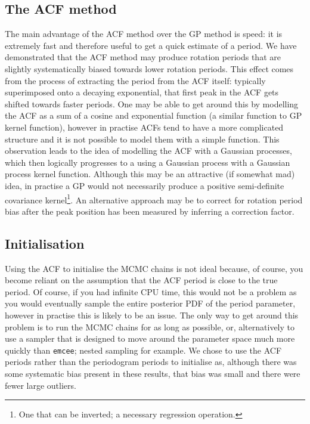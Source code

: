 \subsection{The ACF method}
The main advantage of the ACF method over the GP method is speed: it is
extremely fast and therefore useful to get a quick estimate of a period.
We have demonstrated that the ACF method may produce rotation periods that are
slightly systematically biased towards lower rotation periods.
This effect comes from the process of extracting the period from the ACF
itself: typically superimposed onto a decaying exponential, that first peak in
the ACF gets shifted towards faster periods.
One may be able to get around this by modelling the ACF as a sum of a cosine
and exponential function (a similar function to GP kernel function), however
in practise ACFs tend to have a more complicated structure and it is not
possible to model them with a simple function.
This observation leads to the idea of modelling the ACF with a Gaussian
processes, which then logically progresses to a using a Gaussian process with
a Gaussian process kernel function.
Although this may be an attractive (if somewhat mad) idea, in practise a GP
would not necessarily produce a positive semi-definite covariance
kernel\footnote{One that can be inverted; a necessary regression operation.}.
An alternative approach may be to correct for rotation period bias after the
peak position has been measured by inferring a correction factor.

\subsection{Initialisation}
Using the ACF to initialise the MCMC chains is not ideal because, of course,
you become reliant on the assumption that the ACF period is close to the true
period.
Of course, if you had infinite CPU time, this would not be a problem as you
would eventually sample the entire posterior PDF of the period parameter,
however in practise this is likely to be an issue.
The only way to get around this problem is to run the MCMC chains for as long
as possible, or, alternatively to use a sampler that is designed to move
around the parameter space much more quickly than {\tt emcee}; nested sampling
for example.
We chose to use the ACF periods rather than the periodogram periods to
initialise as, although there was some systematic bias present in these
results, that bias was small and there were fewer large outliers.

